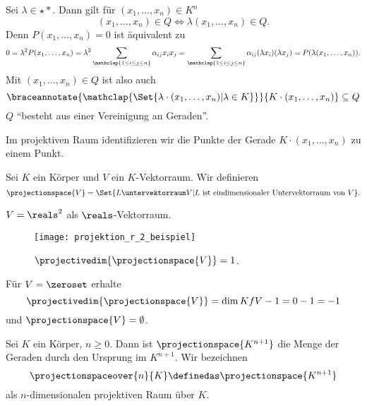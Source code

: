 Sei \( \lambda\in \star{*} \). Dann gilt für \( (x_1,\dotsc,x_n)\in K^n \)
\begin{equation*}
  (x_1,\dotsc,x_n)\in Q\iff \lambda(x_1,\dotsc,x_n)\in Q.
\end{equation*}
Denn \( P(x_1,\dotsc,x_n)=0 \) ist äquivalent zu 
\begin{equation*}
  0=\lambda^2 P(x_1,\dotsc,x_n)=\lambda^2 \sum_{\mathclap{1\leq i\leq j\leq n}} \alpha_{ij}x_i x_j=\sum_{\mathclap{1\leq i\leq j\leq n}} \alpha_{ij}(\lambda x_i)(\lambda x_j)=P(\lambda(x_1,\dotsc,x_n)).
\end{equation*}
Mit \( (x_1,\dotsc,x_n)\in Q \) ist also auch
\begin{equation*}
  \braceannotate{\mathclap{\Set{\lambda\cdot (x_1,\dotsc,x_n)|\lambda\in K}}}{K\cdot (x_1,\dotsc, x_n)}\subseteq Q
\end{equation*}
\dh \( Q \) \enquote{besteht aus einer Vereinigung an Geraden}.
\begin{idee*}
  Im projektiven Raum identifizieren wir die Punkte der Gerade \( K\cdot(x_1,\dotsc,x_n) \) zu einem Punkt.
\end{idee*}  
\begin{definition*}
  Sei \( K \) ein Körper und \( V \) ein \( K \)-Vektorraum. Wir definieren
  \begin{equation*}
    \projectionspace{V}=\Set{L\untervektorraum V| L\ \text{ist eindimensionaler Untervektorraum von \( V \)}}.
  \end{equation*}
\end{definition*}
\begin{beispiel*}
  \( V=\reals^2 \) als \( \reals \)-Vektorraum.
  \begin{figure}[H]
    \centering
    \texttt{[image: projektion\_r\_2\_beispiel]}
    \caption*{\( \projectivedim{\projectionspace{V}}=1 \).}
    \label{fig:projektion_r_2_beispiel}
  \end{figure}
\end{beispiel*}
\begin{bemerkung*}
  Für \( V=\zeroset \) erhalte
  \begin{equation*}
    \projectivedim{\projectionspace{V}}=\dim{K}{f{V}}-1=0-1=-1
  \end{equation*}
  und \( \projectionspace{V}=\emptyset \).
\end{bemerkung*}
\begin{bspdef}
  Sei \( K \) ein Körper, \( n\geq 0 \). Dann ist \( \projectionspace{K^{n+1}} \) die Menge der Geraden durch den Ursprung im \( K^{n+1} \). Wir bezeichnen
  \begin{equation*}
    \projectionspaceover{n}{K}\definedas \projectionspace{K^{n+1}}
  \end{equation*}
  als \( n \)-dimensionalen projektiven Raum über \( K \).
\end{bspdef}
